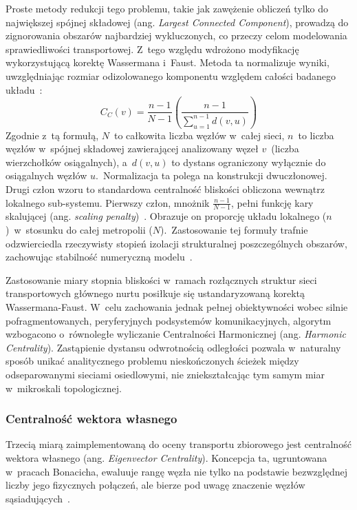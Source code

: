 \documentclass{pracamgr}
\begin{document}
Proste metody redukcji tego problemu, takie jak zawężenie obliczeń tylko do największej spójnej składowej (ang. \textit{Largest Connected Component}), prowadzą do zignorowania obszarów najbardziej wykluczonych, co przeczy celom modelowania sprawiedliwości transportowej. Z~tego względu wdrożono modyfikację wykorzystującą korektę Wassermana i~Faust. Metoda ta normalizuje wyniki, uwzględniając rozmiar odizolowanego komponentu względem całości badanego układu~\cite{freeman, closness_centrality_network_x, closness_centrality_tore_opsahl}:
$$C_C(v) = \frac{n-1}{N-1} \left( \frac{n-1}{\sum_{u=1}^{n-1} d(v, u)} \right)$$
Zgodnie z~tą formułą, $N$~to całkowita liczba węzłów w~całej sieci, $n$~to liczba węzłów w~spójnej składowej zawierającej analizowany węzeł $v$~(liczba wierzchołków osiągalnych), a~$d(v, u)$ to dystans ograniczony wyłącznie do osiągalnych węzłów $u$.~Normalizacja ta polega na konstrukcji dwuczłonowej. Drugi człon wzoru to standardowa centralność bliskości obliczona wewnątrz lokalnego sub-systemu. Pierwszy człon, mnożnik $\frac{n-1}{N-1}$, pełni funkcję kary skalującej (ang. \textit{scaling penalty})~\cite{freeman, closness_centrality_network_x}. Obrazuje on proporcję układu lokalnego ($n$)~w~stosunku do całej metropolii ($N$).~Zastosowanie tej formuły trafnie odzwierciedla rzeczywisty stopień izolacji strukturalnej poszczególnych obszarów, zachowując stabilność numeryczną modelu~\cite{closness_centrality_tore_opsahl}.

Zastosowanie miary stopnia bliskości w~ramach rozłącznych struktur sieci transportowych głównego nurtu posiłkuje się ustandaryzowaną korektą Wassermana-Faust. W~celu zachowania jednak pełnej obiektywności wobec silnie pofragmentowanych, peryferyjnych podsystemów komunikacyjnych, algorytm wzbogacono o~równoległe wyliczanie Centralności Harmonicznej (ang. \textit{Harmonic Centrality}). Zastąpienie dystansu odwrotnością odległości pozwala w~naturalny sposób unikać analitycznego problemu nieskończonych ścieżek między odseparowanymi sieciami osiedlowymi, nie zniekształcając tym samym miar w~mikroskali topologicznej.

\subsubsection{Centralność wektora własnego} %

Trzecią miarą zaimplementowaną do oceny transportu zbiorowego jest centralność wektora własnego (ang. \textit{Eigenvector Centrality}). Koncepcja ta, ugruntowana w~pracach Bonacicha, ewaluuje rangę węzła nie tylko na podstawie bezwzględnej liczby jego fizycznych połączeń, ale bierze pod uwagę znaczenie węzłów sąsiadujących~\cite{hypergraph, eigenvector_centrality_network_x}.
\end{document}
